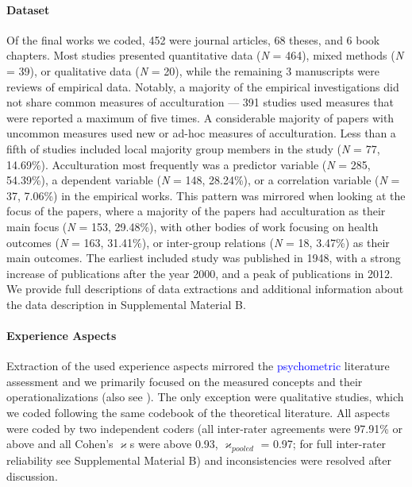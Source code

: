 \paragraph{Dataset}

Of the final works we coded, 452 were journal articles, 68 theses, and 6
book chapters. Most studies presented quantitative data (\textit{N} =
464), mixed methods (\textit{N} = 39), or qualitative data (\textit{N} =
20), while the remaining 3 manuscripts were reviews of empirical data.
Notably, a majority of the empirical investigations did not share common
measures of acculturation --- 391 studies used measures that were
reported a maximum of five times. A considerable majority of papers with
uncommon measures used new or ad-hoc measures of acculturation. Less
than a fifth of studies included local majority group members in the
study (\textit{N} = 77, 14.69\%). Acculturation most frequently was a
predictor variable (\textit{N} = 285, 54.39\%), a dependent variable
(\textit{N} = 148, 28.24\%), or a correlation variable (\textit{N} = 37,
7.06\%) in the empirical works. This pattern was mirrored when looking
at the focus of the papers, where a majority of the papers had
acculturation as their main focus (\textit{N} = 153, 29.48\%), with
other bodies of work focusing on health outcomes (\textit{N} = 163,
31.41\%), or inter-group relations (\textit{N} = 18, 3.47\%) as their
main outcomes. The earliest included study was published in 1948, with a
strong increase of publications after the year 2000, and a peak of
publications in 2012. We provide full descriptions of data extractions
and additional information about the data description in Supplemental
Material B.

\paragraph{Experience Aspects}

Extraction of the used experience aspects mirrored the
\textcolor{blue}{psychometric} literature assessment and we primarily
focused on the measured concepts and their operationalizations (also see
). The only exception were qualitative
studies, which we coded following the same codebook of the theoretical
literature. All aspects were coded by two independent coders (all
inter-rater agreements were 97.91\% or above and all Cohen's
\(\varkappa\)s were above 0.93, \(\varkappa_{pooled}\) = 0.97; for full
inter-rater reliability see Supplemental Material B) and inconsistencies
were resolved after discussion.

